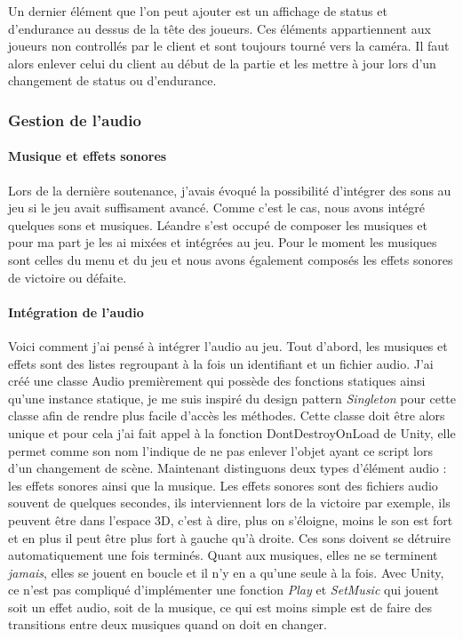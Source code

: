 \documentclass{article}
\begin{document}
Un dernier élément que l'on peut ajouter est un affichage de status et d'endurance au dessus de la tête des joueurs. Ces éléments appartiennent aux joueurs non controllés par le client et sont toujours tourné vers la caméra. Il faut alors enlever celui du client au début de la partie et les mettre à jour lors d'un changement de status ou d'endurance.

\newpage
\subsubsection{Gestion de l'audio}

\paragraph{Musique et effets sonores}

Lors de la dernière soutenance, j'avais évoqué la possibilité d'intégrer des sons au jeu si le jeu avait suffisament avancé. Comme c'est le cas, nous avons intégré quelques sons et musiques. Léandre s'est occupé de composer les musiques et pour ma part je les ai mixées et intégrées au jeu. Pour le moment les musiques sont celles du menu et du jeu et nous avons également composés les effets sonores de victoire ou défaite.

\paragraph{Intégration de l'audio}

Voici comment j'ai pensé à intégrer l'audio au jeu.
Tout d'abord, les musiques et effets sont des listes regroupant à la fois un identifiant et un fichier audio.
J'ai créé une classe Audio premièrement qui possède des fonctions statiques ainsi qu'une instance statique, je me suis inspiré du design pattern \emph{Singleton} pour cette classe afin de rendre plus facile d'accès les méthodes. Cette classe doit être alors unique et pour cela j'ai fait appel à la fonction DontDestroyOnLoad de Unity, elle permet comme son nom l'indique de ne pas enlever l'objet ayant ce script lors d'un changement de scène. Maintenant distinguons deux types d'élément audio : les effets sonores ainsi que la musique. Les effets sonores sont des fichiers audio souvent de quelques secondes, ils interviennent lors de la victoire par exemple, ils peuvent être dans l'espace 3D, c'est à dire, plus on s'éloigne, moins le son est fort et en plus il peut être plus fort à gauche qu'à droite. Ces sons doivent se détruire automatiquement une fois terminés. Quant aux musiques, elles ne se terminent \emph{jamais}, elles se jouent en boucle et il n'y en a qu'une seule à la fois. Avec Unity, ce n'est pas compliqué d'implémenter une fonction \emph{Play} et \emph{SetMusic} qui jouent soit un effet audio, soit de la musique, ce qui est moins simple est de faire des transitions entre deux musiques quand on doit en changer.
\end{document}
